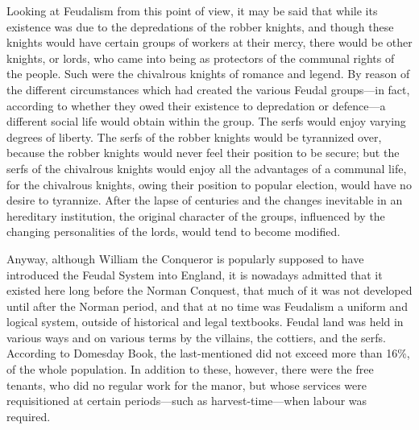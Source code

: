 \documentclass{book}
\begin{document}
Looking at Feudalism from this point of view, it may be said that while its existence was due to the depredations of the robber knights, and though these knights would have certain groups of workers at their mercy, there would be other knights, or lords, who came into being as protectors of the communal rights of the people. Such were the chivalrous knights of romance and legend. By reason of the different circumstances which had created the various Feudal groups—in fact, according to whether they owed their existence to depredation or defence—a different social life would obtain within the group. The serfs would enjoy varying degrees of liberty. The serfs of the robber knights would be tyrannized over, because the robber knights would never feel their position to be secure; but the serfs of the chivalrous knights would enjoy all the advantages of a communal life, for the chivalrous knights, owing their position to popular election, would have no desire to tyrannize. After the lapse of centuries and the changes inevitable in an hereditary institution, the original character of the groups, influenced by the changing personalities of the lords, would tend to become modified.

Anyway, although William the Conqueror is popularly supposed to have introduced the Feudal System into England, it is nowadays admitted that it existed here long before the Norman Conquest, that much of it was not developed until after the Norman period, and that at no time was Feudalism a uniform and logical system, outside of historical and legal textbooks. Feudal land was held in various ways and on various terms by the villains, the cottiers, and the serfs. According to Domesday Book, the last-mentioned did not exceed more than 16\%, of the whole population. In addition to these, however, there were the free tenants, who did no regular work for the manor, but whose services were requisitioned at certain periods—such as harvest-time—when labour was required.
\end{document}
